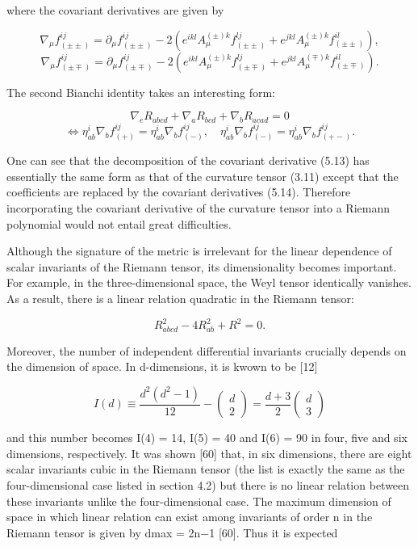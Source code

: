 \documentclass{article}
\begin{document}
where the covariant derivatives are given by

$$\nabla_{\mu}f^{ij}_{(\pm\pm)}=\partial_{\mu}f^{ij}_{(\pm\pm)}-2\left(e^{ikl}A^{(\pm)k}_{\mu}f^{lj}_{(\pm\pm)}+e^{jkl}A^{(\pm)k}_{\mu}f^{il}_{(\pm\pm)}\right),$$ $$\nabla_{\mu}f^{ij}_{(\pm\mp)}=\partial_{\mu}f^{ij}_{(\pm\mp)}-2\left(e^{ikl}A^{(\pm)k}_{\mu}f^{lj}_{(\pm\mp)}+e^{jkl}A^{(\mp)k}_{\mu}f^{il}_{(\pm\mp)}\right).\tag{5.14}$$

The second Bianchi identity takes an interesting form:

$$\nabla_{e}R_{abcd}+\nabla_{a}R_{bcd}+\nabla_{b}R_{acad}=0$$ $$\Leftrightarrow\eta^{i}_{ab}\nabla_{b}f^{ij}_{(+)}=\eta^{i}_{ab}\nabla_{b}f^{ij}_{(-)},\quad\eta^{i}_{ab}\nabla_{b}f^{ij}_{(-)}=\eta^{i}_{ab}\nabla_{b}f^{ij}_{(+-)}.\tag{5.15}$$

One can see that the decomposition of the covariant derivative (5.13) has essentially the same form as that of the curvature tensor (3.11) except that the coefficients are replaced by the covariant derivatives (5.14). Therefore incorporating the covariant derivative of the curvature tensor into a Riemann polynomial would not entail great difficulties.

Although the signature of the metric is irrelevant for the linear dependence of scalar invariants of the Riemann tensor, its dimensionality becomes important. For example, in the three-dimensional space, the Weyl tensor identically vanishes. As a result, there is a linear relation quadratic in the Riemann tensor:

$$R_{a b c d}^{2}-4R_{a b}^{2}+R^{2}=0.$$

Moreover, the number of independent differential invariants crucially depends on the dimension of space. In d-dimensions, it is kwown to be [12]

$$I(d)\equiv\frac{d^{2}(d^{2}-1)}{12}-\left(\begin{array}{c}{{d}}\\ {{2}}\end{array}\right)=\frac{d+3}{2}\left(\begin{array}{c}{{d}}\\ {{3}}\end{array}\right)$$

and this number becomes I(4) = 14, I(5) = 40 and I(6) = 90 in four, five and six dimensions, respectively. It was shown [60] that, in six dimensions, there are eight scalar invariants cubic in the Riemann tensor (the list is exactly the same as the four-dimensional case listed in section 4.2) but there is no linear relation between these invariants unlike the four-dimensional case. The maximum dimension of space in which linear relation can exist among invariants of order n in the Riemann tensor is given by dmax = 2n−1 [60]. Thus it is expected
\end{document}
